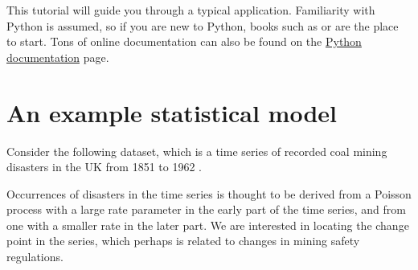 
This tutorial will guide you through a typical  application.
Familiarity with Python is assumed, so if you are new to Python, books such as
\citet{Lutz:2007} or \citet{Langtangen:2009} are the place to start. Tons of
online documentation can also be found on the
\href{http://www.python.org/doc/}{Python documentation} page.

\section{An example statistical model}
Consider the following dataset, which is a time series of recorded coal mining
disasters in the UK from 1851 to 1962 \citep{Jarrett:1979fr}.
\begin{center}
\end{center}
Occurrences of disasters in the time series is thought to be derived from a Poisson process with a large rate parameter in the early part of the time series, and from one with a smaller rate in the later part. We are interested in locating the change point in the series, which perhaps is related to changes in mining safety regulations.

